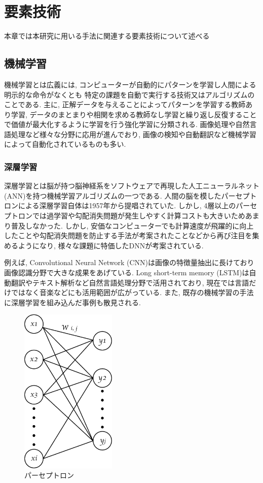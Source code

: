\chapter{要素技術}
\label{technical_background}

本章では本研究に用いる手法に関連する要素技術について述べる


\section{機械学習}

機械学習とは広義には, コンピューターが自動的にパターンを学習し人間による明示的な命令がなくとも
特定の課題を自動で実行する技術又はアルゴリズムのことである. 主に, 正解データを与えることによってパターンを学習する教師あり学習,
データのまとまりや相関を求める教師なし学習と繰り返し反復することで価値が最大化するように学習を行う強化学習に分類される.
画像処理や自然言語処理など様々な分野に応用が進んでおり, 画像の検知や自動翻訳など機械学習によって自動化されているものも多い.


\subsection{深層学習}

深層学習とは脳が持つ脳神経系をソフトウェアで再現した人工ニューラルネット(ANN)を持つ機械学習アルゴリズムの一つである. 
人間の脳を模したパーセプトロンによる深層学習自体は1957年から提唱されていた. しかし, 4層以上のパーセプトロンでは過学習や勾配消失問題が発生しやすく計算コストも大きいためあまり普及しなかった.
しかし, 安価なコンピューターでも計算速度が飛躍的に向上したことや勾配消失問題を防止する手法が考案されたことなどから再び注目を集めるようになり, 様々な課題に特価したDNNが考案されている.

例えば, Convolutional Neural Network (CNN)は画像の特徴量抽出に長けており画像認識分野で大きな成果をあげている.
Long short-term memory (LSTM)は自動翻訳やテキスト解析など自然言語処理分野で活用されており, 現在では言語だけではなく音楽などにも活用範囲が広がっている.
また, 既存の機械学習の手法に深層学習を組み込んだ事例も散見される.
\begin{figure}[H]
    \centering
    \includegraphics[clip,height = 8.0cm]{assets/perceptron.eps}
    \caption{パーセプトロン}  \label{sample}
\end{figure}

